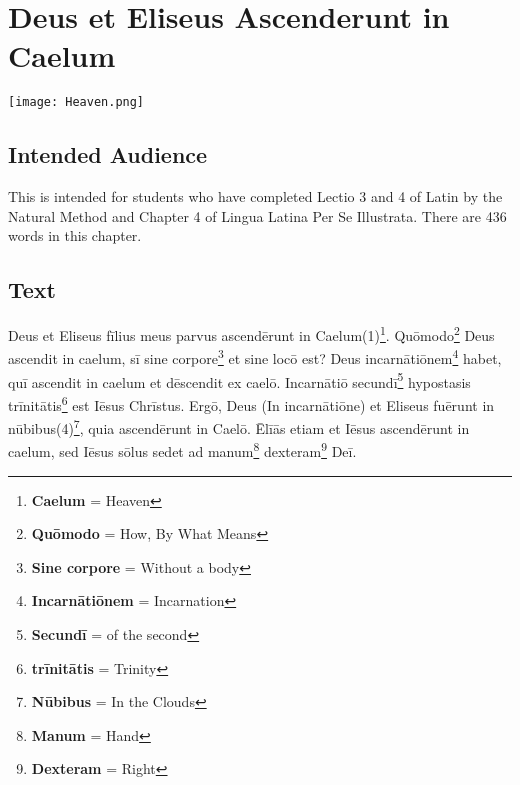 \chapter{Deus et Eliseus Ascenderunt in Caelum}
\begin{center}
\texttt{[image: Heaven.png]}
\end{center}

\section{Intended Audience}
This is intended for students who have completed Lectio 3 and 4 of Latin by the Natural Method and Chapter 4 of Lingua Latina Per Se Illustrata. There are 436 words in this chapter.

\section{Text}
Deus et Eliseus fīlius meus parvus ascendērunt in Caelum(1)\footnote{\textbf{Caelum} = Heaven}. Quōmodo\footnote{\textbf{Quōmodo} = How, By What Means} Deus ascendit in caelum, sī sine corpore\footnote{\textbf{Sine corpore} = Without a body} et sine locō est? Deus incarnātiōnem\footnote{\textbf{Incarnātiōnem} = Incarnation} habet, quī ascendit in caelum et dēscendit ex caelō. Incarnātiō secundī\footnote{\textbf{Secundī} = of the second} hypostasis trīnitātis\footnote{\textbf{trīnitātis} = Trinity} est Iēsus Chrīstus. Ergō, Deus (In incarnātiōne) et Eliseus fuērunt in nūbibus(4)\footnote{\textbf{Nūbibus} = In the Clouds}, quia ascendērunt in Caelō. Ēlīās etiam et Iēsus ascendērunt in caelum, sed Iēsus sōlus sedet ad manum\footnote{\textbf{Manum} = Hand} dexteram\footnote{\textbf{Dexteram} = Right} Deī. \par

